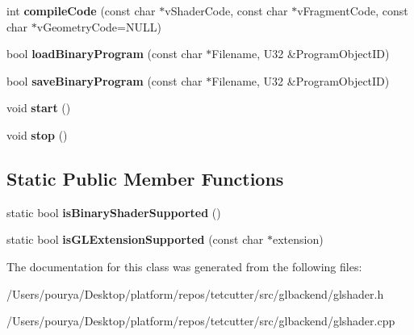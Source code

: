 \begin{DoxyCompactItemize}
\item 
\hypertarget{classps_1_1opengl_1_1GLShader_a11725e81ad0db66da45f35855b6863ef}{}int {\bfseries compile\+Code} (const char $\ast$v\+Shader\+Code, const char $\ast$v\+Fragment\+Code, const char $\ast$v\+Geometry\+Code=N\+U\+L\+L)\label{classps_1_1opengl_1_1GLShader_a11725e81ad0db66da45f35855b6863ef}

\item 
\hypertarget{classps_1_1opengl_1_1GLShader_a308db5f8c499b1458dd69fbba785feaf}{}bool {\bfseries load\+Binary\+Program} (const char $\ast$Filename, U32 \&Program\+Object\+I\+D)\label{classps_1_1opengl_1_1GLShader_a308db5f8c499b1458dd69fbba785feaf}

\item 
\hypertarget{classps_1_1opengl_1_1GLShader_ab2b3d082fb4bb90dec038939b9d18665}{}bool {\bfseries save\+Binary\+Program} (const char $\ast$Filename, U32 \&Program\+Object\+I\+D)\label{classps_1_1opengl_1_1GLShader_ab2b3d082fb4bb90dec038939b9d18665}

\item 
\hypertarget{classps_1_1opengl_1_1GLShader_a29f8c5924cb221d435bf2ee65caa2aef}{}void {\bfseries start} ()\label{classps_1_1opengl_1_1GLShader_a29f8c5924cb221d435bf2ee65caa2aef}

\item 
\hypertarget{classps_1_1opengl_1_1GLShader_a42762e0f509a31f35e401aac89d1a7de}{}void {\bfseries stop} ()\label{classps_1_1opengl_1_1GLShader_a42762e0f509a31f35e401aac89d1a7de}

\end{DoxyCompactItemize}
\subsection*{Static Public Member Functions}
\begin{DoxyCompactItemize}
\item 
\hypertarget{classps_1_1opengl_1_1GLShader_ad15d47f41618f1c4ec5fd2c6b725768a}{}static bool {\bfseries is\+Binary\+Shader\+Supported} ()\label{classps_1_1opengl_1_1GLShader_ad15d47f41618f1c4ec5fd2c6b725768a}

\item 
\hypertarget{classps_1_1opengl_1_1GLShader_ad1ca02f4cc5015f8580a76bd44c3ae20}{}static bool {\bfseries is\+G\+L\+Extension\+Supported} (const char $\ast$extension)\label{classps_1_1opengl_1_1GLShader_ad1ca02f4cc5015f8580a76bd44c3ae20}

\end{DoxyCompactItemize}


The documentation for this class was generated from the following files\+:\begin{DoxyCompactItemize}
\item 
/\+Users/pourya/\+Desktop/platform/repos/tetcutter/src/glbackend/glshader.\+h\item 
/\+Users/pourya/\+Desktop/platform/repos/tetcutter/src/glbackend/glshader.\+cpp\end{DoxyCompactItemize}
